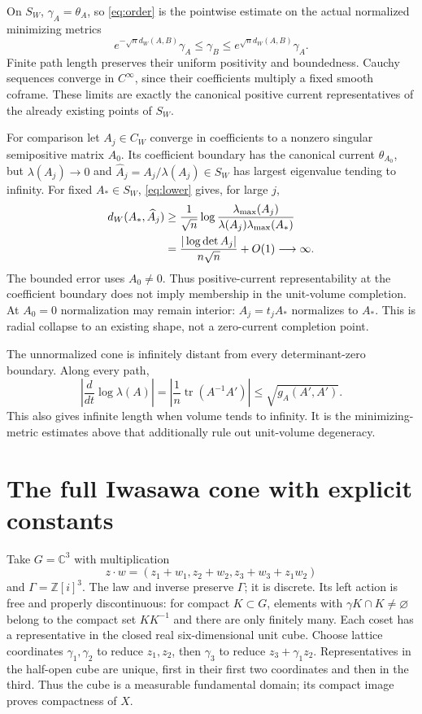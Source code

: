 \documentclass[11pt]{article}
\newcommand{\tr}{\operatorname{tr}}
\newcommand{\C}{\mathbb C}
\begin{document}
On $S_W$, $\gamma_A=\theta_A$, so \eqref{eq:order} is the pointwise
estimate on the actual normalized minimizing metrics
\[
 e^{-\sqrt n d_W(A,B)}\gamma_A
       \leq\gamma_B\leq e^{\sqrt n d_W(A,B)}\gamma_A.
\]
Finite path length preserves their uniform positivity and boundedness.
Cauchy sequences converge in $C^\infty$, since their coefficients multiply
a fixed smooth coframe. These limits are exactly the canonical positive
current representatives of the already existing points of $S_W$.

For comparison let $A_j\in C_W$ converge in coefficients to a nonzero
singular semipositive matrix $A_0$. Its coefficient boundary has the
canonical current $\theta_{A_0}$, but $\lambda(A_j)\to0$ and
$\widehat A_j=A_j/\lambda(A_j)\in S_W$ has largest eigenvalue tending
to infinity. For fixed $A_*\in S_W$, \eqref{eq:lower} gives, for large $j$,
\begin{align}\label{eq:boundary-rate}
 d_W(A_*,\widehat A_j)
 &\geq\frac1{\sqrt n}\log\frac{\lambda_{\max}(A_j)}
                                  {\lambda(A_j)\lambda_{\max}(A_*)}\\
 &=\frac{|\log\det A_j|}{n\sqrt n}+O(1)\longrightarrow\infty.\notag
\end{align}
The bounded error uses $A_0\ne0$.
Thus positive-current representability at the coefficient boundary
does not imply membership in the unit-volume completion.
At $A_0=0$ normalization may remain interior: $A_j=t_jA_*$ normalizes
to $A_*$. This is radial collapse to an existing shape, not a zero-current
completion point.

The unnormalized cone is infinitely distant from every determinant-zero
boundary. Along every path,
\[
 \left|\frac{d}{dt}\log\lambda(A)\right|
 =\left|\frac1n\tr(A^{-1}A')\right|
 \leq\sqrt{g_A(A',A')}.
\]
This also gives infinite length when volume tends to infinity.
It is the minimizing-metric estimates above that additionally rule out
unit-volume degeneracy.

\section{The full Iwasawa cone with explicit constants}
Take $G=\C^3$ with multiplication
\[
 z\cdot w=(z_1+w_1,z_2+w_2,z_3+w_3+z_1w_2)
\]
and $\Gamma=\mathbb Z[i]^3$. The law and inverse preserve $\Gamma$;
it is discrete. Its left action is free and properly discontinuous:
for compact $K\subset G$, elements with $\gamma K\cap K\ne\varnothing$
belong to the compact set $KK^{-1}$ and there are only finitely many.
Each coset has a representative in the closed real six-dimensional unit
cube. Choose lattice coordinates $\gamma_1,\gamma_2$ to reduce $z_1,z_2$,
then $\gamma_3$ to reduce $z_3+\gamma_1z_2$.
Representatives in the half-open cube are unique, first in their first
two coordinates and then in the third. Thus the cube is a measurable
fundamental domain; its compact image proves compactness of $X$.
\end{document}
